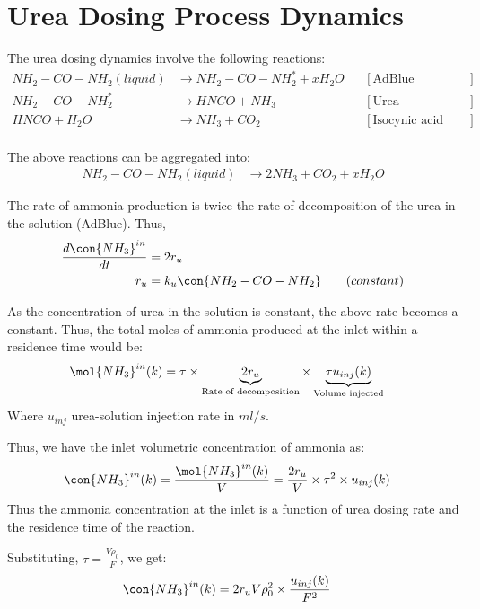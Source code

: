 \newpage
\section{Urea Dosing Process Dynamics}
The urea dosing dynamics involve the following reactions:
\begin{align*}
    NH_2 - CO - NH_2 (liquid) &\longrightarrow NH_2 - CO - NH_2^* + x H_2 O
                & &[\text{AdBlue evaporation}] \\
    NH_2 - CO - NH_2^*  &\longrightarrow  HNCO + NH_3
                & &[\text{Urea decomposition}] \\
    HNCO + H_2O &\longrightarrow NH_3 + CO_2
                & &[\text{Isocynic acid hydrolysis}] \\
\end{align*}

The above reactions can be aggregated into:
\begin{align*}
    NH_2 - CO - NH_2 (liquid) &\longrightarrow 2 NH_3 + CO_2 + x H_2 O
\end{align*}

The rate of ammonia production is twice the rate of decomposition of the urea in the solution (AdBlue). Thus,
\begin{align*}
    \frac{d \con{NH_3}^{in}}{dt} &= 2 r_{u}\\
    r_{u} &= k_{u} \con{NH_2 - CO - NH_2} \qquad (constant)
\end{align*}

As the concentration of urea in the solution is constant, the above rate becomes a constant. Thus, the total moles of
ammonia produced at the inlet within a residence time would be:
\begin{align*}
    \mol{NH_3}^{in} (k) &= \tau \times \underbrace{2 r_{u}}_{\text{Rate of decomposition}} \times \underbrace{\tau u_{inj} (k)}_{\text{Volume injected}}
\end{align*}
Where $u_{inj}$ urea-solution injection rate in $ml/s$.

Thus, we have the inlet volumetric concentration of ammonia as:
\begin{align*}
    \con{NH_3}^{in} (k) &= \frac{\mol{NH_3}^{in} (k)}{V}
                          = \frac{2 r_u}{V} \times \tau^2 \times u_{inj} (k)
\end{align*}
Thus the ammonia concentration at the inlet is a function of urea dosing rate and the residence time of the reaction.

Substituting, $\tau = \frac{V \rho_0}{F}$, we get:
\begin{align}
    \con{NH_3}^{in} (k) &= 2r_u V \rho^2_0 \times \frac{u_{inj}(k)}{F^2}
\end{align}

